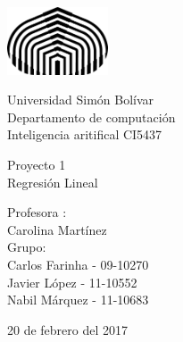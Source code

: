 

\begin{titlepage}

\setlength{\hoffset}{-4cm}
\setlength{\voffset}{-1in}
\setlength{\topmargin}{1.5cm}
\setlength{\headheight}{0.5cm}
\setlength{\headsep}{1cm}
\setlength{\oddsidemargin}{3cm}
\setlength{\evensidemargin}{3cm}
\setlength{\footskip}{1.5cm}
\enlargethispage{1cm}

\fontsize{12pt}{14pt}
\selectfont

\begin{center}

\includegraphics[height=2cm]{logo.png}

\vspace{0.5cm}

Universidad Sim\'on Bol\'ivar\\
Departamento de computaci\'on\\
Inteligencia aritifical CI5437\\

\vspace{3.5cm}

\fontsize{17.28pt}{21pt}
\selectfont

Proyecto 1 \\
Regresi\'on Lineal\\

\fontsize{12pt}{14pt}
\selectfont

\vspace{.6cm}



\vspace{.4cm}


\vspace{3cm}

Profesora : \\
Carolina Mart\'inez\\
\vspace{1cm}
Grupo: \\
Carlos Farinha   - 09-10270 \\
Javier L\'opez     - 11-10552 \\
Nabil  M\'arquez  - 11-10683 \\


\vspace{1cm}

20 de febrero del 2017

\end{center}
\end{titlepage}


